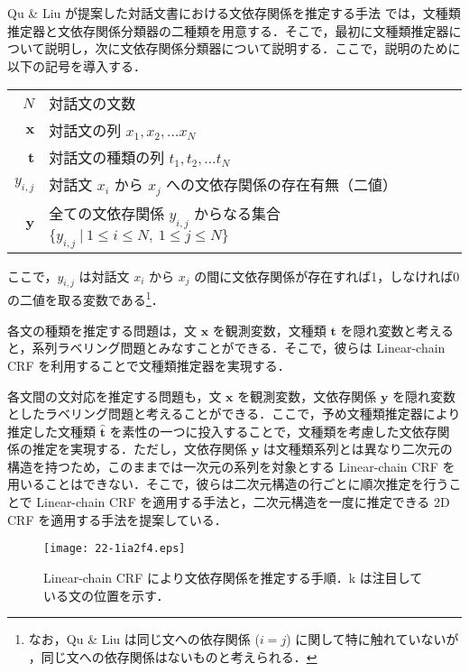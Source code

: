 \documentclass[japanese]{jnlp_1.4}
\begin{document}
Qu \& Liu が提案した対話文書における文依存関係を推定する手法 \cite{Zhonghua2012} では，文種類推定器と文依存関係分類器の二種類を用意する．そこで，最初に文種類推定器について説明し，次に文依存関係分類器について説明する．ここで，説明のために以下の記号を導入する．

\vspace{0.25zh}
\begin{tabular}{rl}
$N$                    & 対話文の文数 \\
$\bm{x}$               & 対話文の列 $x_1, x_2, \dots x_N$ \\
$\bm{t}$               & 対話文の種類の列 $t_1, t_2, \dots t_N$ \\
$y_{i,j}$              & 対話文 $x_i$ から $x_j$ への文依存関係の存在有無（二値） \\
$\bm{y}$               & 全ての文依存関係 $y_{i,j}$ からなる集合 $\{ y_{i,j} ~|~ 1 \leq i \leq N,~ 1 \leq j \leq N \}$ \\
\end{tabular}
\vspace{0.25zh}

\noindent
ここで，$y_{i,j}$ は対話文 $x_i$ から $x_j$ の間に文依存関係が存在すれば1，しなければ0の二値を取る変数である\footnote{なお，Qu \& Liu は同じ文への依存関係 ($i=j$) に関して特に触れていないが \cite{Zhonghua2012}，同じ文への依存関係はないものと考えられる．}．

各文の種類を推定する問題は，文 $\bm{x}$ を観測変数，文種類 $\bm{t}$ を隠れ変数と考えると，系列ラベリング問題とみなすことができる．そこで，彼らは Linear-chain CRF \cite{Lafferty2001} を利用することで文種類推定器を実現する．

各文間の文対応を推定する問題も，文 $\bm{x}$ を観測変数，文依存関係 $\bm{y}$ を隠れ変数としたラベリング問題と考えることができる．ここで，予め文種類推定器により推定した文種類 $\hat{\bm{t}}$ を素性の一つに投入することで，文種類を考慮した文依存関係の推定を実現する．ただし，文依存関係 $\bm{y}$ は文種類系列とは異なり二次元の構造を持つため，このままでは一次元の系列を対象とする Linear-chain CRF を用いることはできない．そこで，彼らは二次元構造の行ごとに順次推定を行うことで Linear-chain CRF を適用する手法と，二次元構造を一度に推定できる 2D CRF \cite{Zhu2005} を適用する手法を提案している．

\begin{figure}[b]
\begin{center}
\texttt{[image: 22-1ia2f4.eps]}
\end{center}
\caption{Linear-chain CRF により文依存関係を推定する手順．k は注目している文の位置を示す．}
\label{fig:L-CRFc}
\end{figure}
\end{document}
